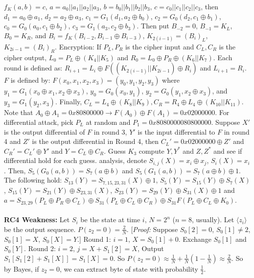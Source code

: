 $f_K(a,b)= c$, 
$a= a_0 || a_1 ||a_2 ||a_3$,
$b= b_0 || b_1 ||b_2 ||b_3$,
$c= c_0 || c_1 ||c_2 ||c_3$, then 
$d_1= a_0 \oplus a_1$,
$d_2= a_2 \oplus a_3$,
$c_1= G_1(d_1, a_2 \oplus b_0)$,
$c_2= G_0(d_2, c_1 \oplus b_1)$,
$c_0= G_0(a_0, c_1 \oplus b_2)$,
$c_3= G_1(a_3, c_2 \oplus b_3)$.  Then put 
$B_{-2}=0$,
$B_{-1}= K_L$,
$B_{0}= K_R$, and
$B_{i}= f_K(B_{i-2}, B_{i-1} \oplus B_{i-3})$, 
$K_{2(i-1)}= (B_i)_L$,
$K_{2i-1}= (B_i)_R$.
Encryption:
If $P_L, P_R$ is the cipher input and
$C_L, C_R$ is the cipher output, $L_0= P_L \oplus (K_4 || K_5)$ and
$R_0= L_0 \oplus P_R \oplus (K_6 || K_7)$.  Each round is defined as:
$R_{i+1}= L_i \oplus F((K_{2(i-1)} || K_{2i-1}) \oplus R_i)$ and
$L_{i+1}= R_i$.  $F$ is defined by:
$F(x_0, x_1, x_2, x_3) = (y_0, y_1, y_2, y_3)$ where
$y_1=G_1(x_0 \oplus x_1 , x_2 \oplus x_3)$,
$y_0=G_0(x_0, y_1)$,
$y_2=G_0(y_1, x_2 \oplus x_3)$, and
$y_3=G_1(y_2, x_3)$.  Finally, 
$C_L= L_4 \oplus (K_8 || K_9), C_R= R_4 \oplus L_4 \oplus (K_{10} || K_{11})$.  Note that
$A_0 \oplus A_1 = 0x80800000 \rightarrow F(A_0 ) \oplus F(A_1 ) = 0x02000000$.
For differential attack, pick $P_L$ at random and $P_1= 0x8080000080800000$.
Suppose $X'$ is the output differential of $F$ in round 3, $Y'$ is the input differential
to $F$ in round 4 and $Z'$ is the output differential in Round 4, then
$C_L'= 0x02000000 \oplus Z'$ and $C_R'= C_L' \oplus Y'$ and $Y=C_L \oplus C_R$.  Guess $K_3$
compute $Y, Y^*$ and $Z, Z^*$ and see if differential hold for each guess.
analysis, denote $S_{i,j}(X)= x_i \oplus x_j$, $S_i(X)= x_i$.  Then,
$S_5(G_0(a,b))= S_7(a \oplus b)$ and
$S_5(G_1(a,b))= S_7(a \oplus b) \oplus 1$.  The following hold:
$S_{13}(Y)= S_{7,15,23,31}(X) \oplus 1$,
$S_{5}(Y)= S_{15}(Y) \oplus S_{7}(X)$,
$S_{15}(Y)= S_{21}(Y) \oplus  S_{23, 31}(X)$,
$S_{23}(Y)= S_{29}(Y) \oplus S_{31}(X) \oplus 1$ and
$a= S_{23, 29}(P_L \oplus P_R  \oplus C_L) \oplus S_{31}(P_L \oplus C_L \oplus C_R)
\oplus S_{31}F(P_L \oplus C_L \oplus K_0)$.
\\
\\
{\bf RC4 Weakness:}  Let $S_i$ be the state at time $i$, $N= 2^n$ ($n=8$,
usually).
Let $\langle z_i \rangle$ be the output sequence.  $P(z_2=0)= {\frac 2 N}$.
[\emph{Proof:} Suppose $S_0[2]=0$, $S_0[1] \ne 2$, $S_0[1]= X$, $S_0[X]= Y$.]
Round 1:
$i=1$, $X=S_0[1]+0$.  Exchange $S_0[1]$ and $S_0[Y]$.  Round 2: $i=2$,
$j= X+S_1[2]=X$,  Output $S_1[S_1[2]+S_1[X]]= S_1[X]= 0$.  So
$P(z_2 = 0) \approx {\frac 1 N} + {\frac 1 N} (1- {\frac 1 N}) \approx
{\frac 2 N}$.  So by Bayes, if $z_2= 0$, we can extract byte of state with
probability ${\frac 1 2}$.
